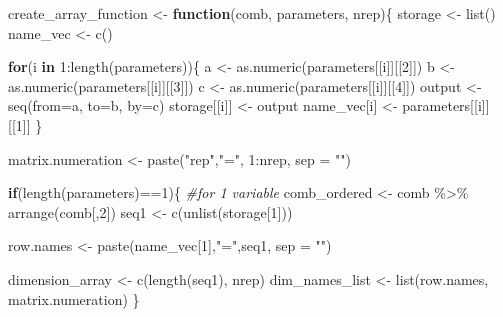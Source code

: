 \documentclass[11pt,a4paper]{article}
\newenvironment{Shaded}{\begin{snugshade}}{\end{snugshade}}
\newcommand{\AttributeTok}[1]{\textcolor[rgb]{0.77,0.63,0.00}{#1}}
\newcommand{\CommentTok}[1]{\textcolor[rgb]{0.56,0.35,0.01}{\textit{#1}}}
\newcommand{\ControlFlowTok}[1]{\textcolor[rgb]{0.13,0.29,0.53}{\textbf{#1}}}
\newcommand{\DecValTok}[1]{\textcolor[rgb]{0.00,0.00,0.81}{#1}}
\newcommand{\FunctionTok}[1]{\textcolor[rgb]{0.00,0.00,0.00}{#1}}
\newcommand{\NormalTok}[1]{#1}
\newcommand{\OtherTok}[1]{\textcolor[rgb]{0.56,0.35,0.01}{#1}}
\newcommand{\SpecialCharTok}[1]{\textcolor[rgb]{0.00,0.00,0.00}{#1}}
\newcommand{\StringTok}[1]{\textcolor[rgb]{0.31,0.60,0.02}{#1}}
\begin{document}
\begin{Shaded}
\begin{Highlighting}[]
\NormalTok{create\_array\_function }\OtherTok{\textless{}{-}} \ControlFlowTok{function}\NormalTok{(comb, parameters, nrep)\{}
\NormalTok{  storage }\OtherTok{\textless{}{-}} \FunctionTok{list}\NormalTok{()}
\NormalTok{  name\_vec }\OtherTok{\textless{}{-}} \FunctionTok{c}\NormalTok{()}
  
  \ControlFlowTok{for}\NormalTok{(i }\ControlFlowTok{in} \DecValTok{1}\SpecialCharTok{:}\FunctionTok{length}\NormalTok{(parameters))\{ }
\NormalTok{    a }\OtherTok{\textless{}{-}} \FunctionTok{as.numeric}\NormalTok{(parameters[[i]][[}\DecValTok{2}\NormalTok{]])}
\NormalTok{    b }\OtherTok{\textless{}{-}} \FunctionTok{as.numeric}\NormalTok{(parameters[[i]][[}\DecValTok{3}\NormalTok{]])}
\NormalTok{    c }\OtherTok{\textless{}{-}} \FunctionTok{as.numeric}\NormalTok{(parameters[[i]][[}\DecValTok{4}\NormalTok{]])}
\NormalTok{    output }\OtherTok{\textless{}{-}} \FunctionTok{seq}\NormalTok{(}\AttributeTok{from=}\NormalTok{a, }\AttributeTok{to=}\NormalTok{b, }\AttributeTok{by=}\NormalTok{c)}
\NormalTok{    storage[[i]] }\OtherTok{\textless{}{-}}\NormalTok{  output}
\NormalTok{    name\_vec[i] }\OtherTok{\textless{}{-}}\NormalTok{ parameters[[i]][[}\DecValTok{1}\NormalTok{]] }
\NormalTok{  \}}
  
  
\NormalTok{  matrix.numeration }\OtherTok{\textless{}{-}}  \FunctionTok{paste}\NormalTok{(}\StringTok{"rep"}\NormalTok{,}\StringTok{"="}\NormalTok{, }\DecValTok{1}\SpecialCharTok{:}\NormalTok{nrep, }\AttributeTok{sep =} \StringTok{""}\NormalTok{)}
  
  \ControlFlowTok{if}\NormalTok{(}\FunctionTok{length}\NormalTok{(parameters)}\SpecialCharTok{==}\DecValTok{1}\NormalTok{)\{ }\CommentTok{\#for 1 variable}
\NormalTok{    comb\_ordered }\OtherTok{\textless{}{-}}\NormalTok{  comb }\SpecialCharTok{\%\textgreater{}\%} \FunctionTok{arrange}\NormalTok{(comb[,}\DecValTok{2}\NormalTok{])}
\NormalTok{    seq1 }\OtherTok{\textless{}{-}} \FunctionTok{c}\NormalTok{(}\FunctionTok{unlist}\NormalTok{(storage[}\DecValTok{1}\NormalTok{]))}
    
\NormalTok{    row.names }\OtherTok{\textless{}{-}} \FunctionTok{paste}\NormalTok{(name\_vec[}\DecValTok{1}\NormalTok{],}\StringTok{"="}\NormalTok{,seq1, }\AttributeTok{sep =} \StringTok{""}\NormalTok{)}
    
\NormalTok{    dimension\_array }\OtherTok{\textless{}{-}} \FunctionTok{c}\NormalTok{(}\FunctionTok{length}\NormalTok{(seq1), nrep)}
\NormalTok{    dim\_names\_list }\OtherTok{\textless{}{-}} \FunctionTok{list}\NormalTok{(row.names, matrix.numeration)}
\NormalTok{  \}}
  

\end{Highlighting}
\end{Shaded}
\end{document}
